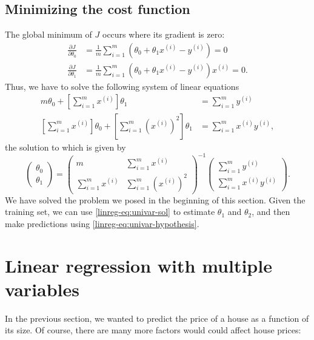 \documentclass{article}
\theoremstyle{definition}
\begin{document}
\subsection{Minimizing the cost function}
The global minimum of $J$ occurs where its gradient is zero:
\begin{align*}
    \frac{\partial J}{\partial\theta_0} &= \frac{1}{m}\sum_{i=1}^{m}(\theta_0 + \theta_1 x^{(i)} - y^{(i)}) = 0 \\
    \frac{\partial J}{\partial\theta_1} &= \frac{1}{m}\sum_{i=1}^{m}(\theta_0 + \theta_1 x^{(i)} - y^{(i)})x^{(i)} = 0.
\end{align*}
Thus, we have to solve the following system of linear equations
\begin{align*}
    m \theta_0 + \left[\sum_{i=1}^{m}x^{(i)}\right]\theta_1 &= \sum_{i=1}^{m} y^{(i)}\\
    \left[\sum_{i=1}^{m}x^{(i)}\right] \theta_0 + \left[\sum_{i=1}^{m}\left(x^{(i)}\right)^2\right]\theta_1 &= \sum_{i=1}^{m} x^{(i)}y^{(i)},
\end{align*}
the solution to which is given by
\begin{equation}
\begin{pmatrix}
\theta_0\\
\theta_1
\end{pmatrix}
=
\begin{pmatrix}
m & \sum_{i=1}^{m}x^{(i)}\\
\sum_{i=1}^{m}x^{(i)} & \sum_{i=1}^{m}\left(x^{(i)}\right)^2
\end{pmatrix}^{-1}
\begin{pmatrix}
\sum_{i=1}^{m}y^{(i)}\\
\sum_{i=1}^{m}x^{(i)}y^{(i)}
\end{pmatrix}.
\label{linreg-eq:univar-sol}
\end{equation}
We have solved the problem we posed in the beginning of this section. Given the training set, we can use \eqref{linreg-eq:univar-sol} to estimate $\theta_1$ and $\theta_2$, and then make predictions using \eqref{linreg-eq:univar-hypothesis}.


\section{Linear regression with multiple variables}
In the previous section, we wanted to predict the price of a house as a function of its size. Of course, there are many more factors would could affect house prices:
\end{document}
